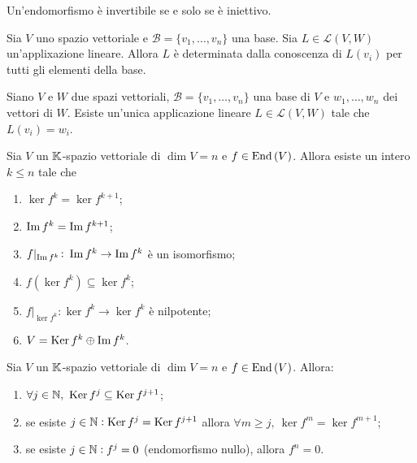 \begin{prop}
	Un'endomorfismo è invertibile se e solo se è iniettivo.
\end{prop}

\begin{thm}
	Sia $V$ uno spazio vettoriale e $ \mathscr{B} = \{v_1, \ldots, v_n\} $ una base. Sia $ L \in \mathscr{L}{(V, W)} $ un'applixazione lineare. Allora $L$ è determinata dalla conoscenza di $L(v_i)$ per tutti gli elementi della base.
\end{thm}

\begin{thm}
	Siano $V$ e $W$ due spazi vettoriali, $ \mathscr{B} = \{v_1, \ldots, v_n\} $ una base di $V$ e $w_1, \ldots, w_n$ dei vettori di $W$. Esiste un'unica applicazione lineare $L \in \mathscr{L}{(V, W)}$ tale che $L(v_i) = w_i$.
\end{thm}


\begin{fatto}
	Sia $ V $ un $ \mathbb{K} $-spazio vettoriale di $ \dim{V} = n $ e $ f \in \operatorname{End}{(V)} $. Allora esiste un intero $ k \leq n $ tale che \begin{enumerate}[label = (\roman*)]
		\item $ \ker{f^{k}} = \ker{f^{k + 1}} $;
		\item $ \operatorname{Im}{f^{k}} = \operatorname{Im}{f^{k + 1}} $;
		\item $ f\lvert_{\operatorname{Im}{f^{k}}} \colon \operatorname{Im}{f^{k}} \to \operatorname{Im}{f^{k}} $ è un isomorfismo;
		\item $ f(\ker{f^{k}}) \subseteq \ker{f^{k}} $;
		\item $ f\lvert_{\ker{f^{k}}} \colon \ker{f^{k}} \to \ker{f^{k}} $ è nilpotente;
		\item $ V = \operatorname{Ker}{f^{k}} \oplus \operatorname{Im}{f^{k}} $.
	\end{enumerate}
\end{fatto}

\begin{fatto}
	Sia $ V $ un $ \mathbb{K} $-spazio vettoriale di $ \dim{V} = n $ e $ f \in \operatorname{End}{(V)} $. Allora:
	\begin{enumerate}
		\item $ \forall j \in \mathbb{N}, \ \operatorname{Ker}{f^{j}} \subseteq \operatorname{Ker}{f^{j + 1}} $;
		\item se esiste $ j \in \mathbb{N} : \operatorname{Ker}{f^{j}} = \operatorname{Ker}{f^{j + 1}} $ allora $ \forall m \geq j, \ \ker{f^{m}} = \ker{f^{m + 1}} $;
		\item se esiste $ j \in \mathbb{N} : f^{j} = 0 $ (endomorfismo nullo), allora $ f^{n} = 0 $. 
	\end{enumerate}
\end{fatto}